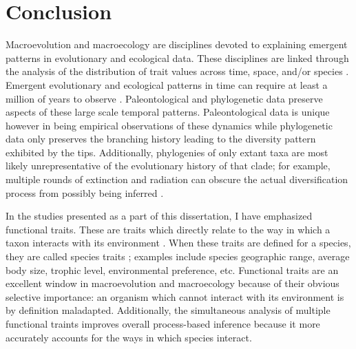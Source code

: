 \chapter{Conclusion} \label{ch:conclusion}



Macroevolution and macroecology are disciplines devoted to explaining emergent patterns in evolutionary and ecological data. These disciplines are linked through the analysis of the distribution of trait values across time, space, and/or species \citep{Mcgill2006,Weber2017}. Emergent evolutionary and ecological patterns in time can require at least a million of years to observe \citep{Uyeda2011a}. Paleontological and phylogenetic data preserve aspects of these large scale temporal patterns. Paleontological data is unique however in being empirical observations of these dynamics while phylogenetic data only preserves the branching history leading to the diversity pattern exhibited by the tips. Additionally, phylogenies of only extant taxa are most likely unrepresentative of the evolutionary history of that clade; for example, multiple rounds of extinction and radiation can obscure the actual diversification process from possibly being inferred \citep{Mitchell2015a,Mitchell2014b,Liow2010a,Quental2009}.

In the studies presented as a part of this dissertation, I have emphasized functional traits. These are traits which directly relate to the way in which a taxon interacts with its environment \citep{Mcgill2006}. When these traits are defined for a species, they are called species traits \citep{Mcgill2006}; examples include species geographic range, average body size, trophic level, environmental preference, etc. Functional traits are an excellent window in macroevolution and macroecology because of their obvious selective importance: an organism which cannot interact with its environment is by definition maladapted. Additionally, the simultaneous analysis of multiple functional traints improves overall process-based inference because it more accurately accounts for the ways in which species interact. 


